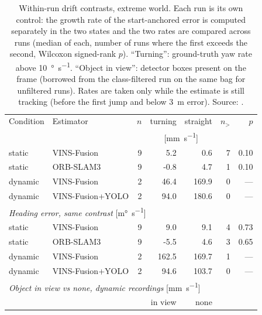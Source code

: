 \begin{table}[htbp]
\centering
\small
\caption[Within-run drift contrasts, extreme world.]{Within-run drift contrasts, extreme world. Each run is its own control: the growth rate of the start-anchored error is computed separately in the two states and the two rates are compared across runs (median of each, number of runs where the first exceeds the second, Wilcoxon signed-rank $p$). ``Turning'': ground-truth yaw rate above \SI{10}{\degree\per\second}. ``Object in view'': detector boxes present on the frame (borrowed from the class-filtered run on the same bag for unfiltered runs). Rates are taken only while the estimate is still tracking (before the first jump and below \SI{3}{\metre} error). Source: .}
\label{tab:insight-contrast-extreme}
\begin{tabular}{llrrrrr}
\toprule
Condition & Estimator & $n$ & turning & straight & $n_{>}$ & $p$ \\
 & & & \multicolumn{2}{c}{[\si{\milli\metre\per\second}]} & & \\
\midrule
static & VINS-Fusion & 9 & 5.2 & 0.6 & 7 & 0.10 \\
static & ORB-SLAM3 & 9 & -0.8 & 4.7 & 1 & 0.10 \\
dynamic & VINS-Fusion & 2 & 46.4 & 169.9 & 0 & --- \\
dynamic & VINS-Fusion+YOLO & 2 & 94.0 & 180.6 & 0 & --- \\
\midrule
\multicolumn{7}{l}{\emph{Heading error, same contrast} [\si{\milli\degree\per\second}]} \\
static & VINS-Fusion & 9 & 9.0 & 9.1 & 4 & 0.73 \\
static & ORB-SLAM3 & 9 & -5.5 & 4.6 & 3 & 0.65 \\
dynamic & VINS-Fusion & 2 & 162.5 & 169.7 & 1 & --- \\
dynamic & VINS-Fusion+YOLO & 2 & 94.6 & 103.7 & 0 & --- \\
\midrule
\multicolumn{7}{l}{\emph{Object in view vs none, dynamic recordings} [\si{\milli\metre\per\second}]} \\
 & & & in view & none & & \\
\bottomrule
\end{tabular}
\end{table}
